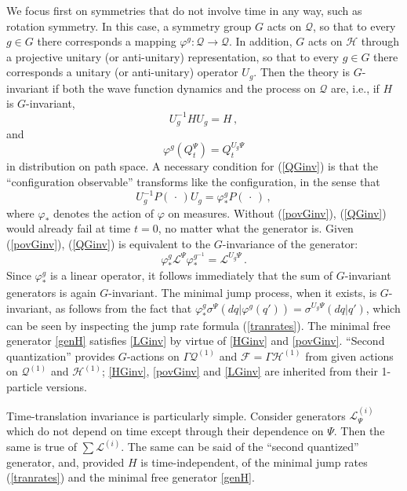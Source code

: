 \documentclass[12pt]{article}
\newcommand{\1}{\mathbf{1}} %
\newcommand{\Hilbert}{\mathscr{H}}
\newcommand{\Fock}{\mathscr{F}} %
\newcommand{\conf}{\mathcal{Q}} %
\newcommand{\generator}{\mathscr{L}} %
\newcommand{\pov}{{P}}%
\begin{document}
We focus first on symmetries that do not involve time in any way,
such as rotation symmetry. In this case, a symmetry group $G$ acts on
$\conf$, so that to every $g \in G$ there corresponds a mapping
$\varphi^g:
\conf \to \conf$.  In addition, $G$ acts on $\Hilbert$ through a
projective unitary (or anti-unitary) representation, so that to every $g
\in G$ there corresponds a unitary (or anti-unitary) operator $U_g$.
Then the theory is $G$-invariant if both the wave function dynamics
and the process on $\conf$ are, i.e., if $H$ is $G$-invariant,
\begin{equation}\label{HGinv}
   U_g^{-1} H U_g = H\,,
\end{equation}
and
\begin{equation}\label{QGinv}
   \varphi^g(Q_t^\Psi) = Q_t^{U_g \Psi}
\end{equation}
in distribution on path space.  A necessary condition for
(\ref{QGinv}) is that the ``configuration observable'' transforms like
the configuration, in the sense that
\begin{equation}\label{povGinv}
   U_g^{-1} \pov(\,\cdot\,) U_g = \varphi^g_* \pov(\,\cdot\,)\,,
\end{equation}
where $\varphi_*$ denotes the action of $\varphi$ on measures.
Without (\ref{povGinv}), (\ref{QGinv}) would already fail at time
$t=0$, no matter what the generator is.  Given (\ref{povGinv}),
(\ref{QGinv}) is equivalent to the $G$-invariance of the generator:
\begin{equation}\label{LGinv}
   \varphi^g_* \generator^\Psi \varphi^{g^{-1}}_* =
   \generator^{U_g \Psi} \,.
\end{equation}
Since $\varphi^g_*$ is a linear operator, it follows immediately that
the sum of $G$-invariant generators is again $G$-invariant.  The
minimal jump process, when it exists, is $G$-invariant, as follows
from the fact that $\varphi^g_*\sigma^\Psi(dq|\varphi^g(q')) =
\sigma^{U_g \Psi} (dq|q')$, which can be seen by inspecting the jump
rate formula (\ref{tranrates}). The minimal free generator
\eqref{genH} satisfies \eqref{LGinv} by virtue of \eqref{HGinv} and
\eqref{povGinv}. ``Second quantization'' provides $G$-actions on
$\Gamma \conf^{(1)}$ and $\Fock = \Gamma \Hilbert^{(1)}$ from given
actions on $\conf^{(1)}$ and $\Hilbert^{(1)}$; \eqref{HGinv},
\eqref{povGinv} and \eqref{LGinv} are inherited from their 1-particle
versions.

Time-translation invariance is particularly simple. Consider
generators $\generator^{(i)}_\Psi$ which do not depend on time except
through their dependence on $\Psi$.  Then the same is true of $\sum
\generator^{(i)}$. The same can be said of the ``second quantized''
generator, and, provided $H$ is time-independent, of the minimal jump
rates (\ref{tranrates}) and the minimal free generator \eqref{genH}.
\end{document}
